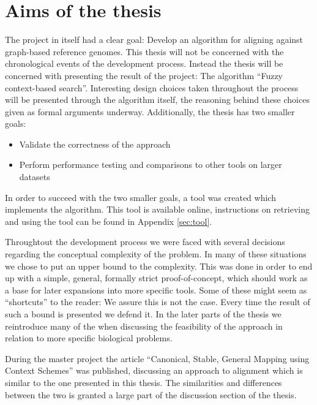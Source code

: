 \documentclass[thesis.tex]{subfiles}
\begin{document}
\section{Aims of the thesis}
The project in itself had a clear goal: Develop an algorithm for aligning against graph-based reference genomes. This thesis will not be concerned with the chronological events of the development process. Instead the thesis will be concerned with presenting the result of the project: The algorithm ``Fuzzy context-based search''. Interesting design choices taken throughout the process will be presented through the algorithm itself, the reasoning behind these choices given as formal arguments underway. Additionally, the thesis has two smaller goals:
\begin{itemize}
  \item Validate the correctness of the approach
  \item Perform performance testing and comparisons to other tools on larger datasets
\end{itemize}
In order to succeed with the two smaller goals, a tool was created which implements the algorithm. This tool is available online, instructions on retrieving and using the tool can be found in Appendix \ref{sec:tool}.\\
\par\noindent
Throughtout the development process we were faced with several decisions regarding the conceptual complexity of the problem. In many of these situations we chose to put an upper bound to the complexity. This was done in order to end up with a simple, general, formally strict proof-of-concept, which should work as a base for later expansions into more specific tools. Some of these might seem as ``shortcuts'' to the reader: We assure this is not the case. Every time the result of such a bound is presented we defend it. In the later parts of the thesis we reintroduce many of the when discussing the feasibility of the approach in relation to more specific biological problems.\\
\par\noindent
During the master project the article ``Canonical, Stable, General Mapping using Context Schemes'' was published, discussing an approach to alignment which is similar to the one presented in this thesis. The similarities and differences between the two is granted a large part of the discussion section of the thesis.
\end{document}
